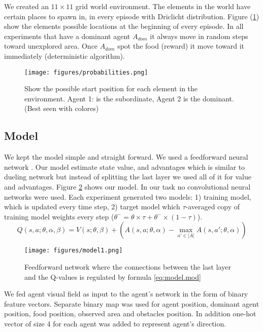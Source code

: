 \documentclass{article}
\begin{document}
We created an $11\times11$ grid world environment. The elements in the world have certain places to spawn in, in every episode with Driclicht distribution. Figure (\ref{fig:probabilities}) show the elements possible locations at the beginning of every episode. In all experiments that have a dominant agent \(A_{dom}\) it always move in random steps toward unexplored area. Once \(A_{dom}\) spot the food (reward) it move toward it immediately (deterministic algorithm).
\begin{figure}[H]
    \centering
    \texttt{[image: figures/probabilities.png]}
    \caption{Show the possible start position for each element in the environment. Agent 1: is the subordinate, Agent 2 is the dominant.(Best seen with colores)}
    \label{fig:probabilities}
\end{figure}

\subsection{Model}
We kept the model simple and straight forward. We used a feedforward neural network \cite{Goodfellow-et-al-2016}. Our model estimate state value, and advantages which is similar to dueling network \cite{DBLP:journals/corr/WangFL15} but instead of splitting the last layer we used all of it for value and advantages. Figure \ref{fig.model} shows our model. In our task no convolutional neural networks were used. Each experiment generated two models: 1) training model, which is updated every time step, 2) target model which $\tau$-averaged copy of training model weights every step (\(\theta^{-} = \theta \times \tau + \theta^{-} \times (1-\tau)\)).
  \begin{equation} \label{eq:model.mod}
    Q(s,a;\theta,\alpha,\beta) = V(s;\theta,\beta) +\left( A(s,a;\theta,\alpha) - \underset{a' \in |A|}{\max}A(s,a';\theta,\alpha) \right)
  \end{equation}
\begin{figure}[!ht]
\begin{center}
\texttt{[image: figures/model1.png]}
\caption{Feedforward network where the connections between the last layer and the Q-values is regulated by formula \ref{eq:model.mod}}
\label{fig.model}
\end{center}
\end{figure}

 \par We fed \label{network.input} agent visual field as input to the agent's network in the form of binary feature vectors. Separate binary map was used for agent position, dominant agent position, food position, observed area and obstacles position. In addition one-hot vector of size 4 for each agent was added to represent agent's direction.
\end{document}
